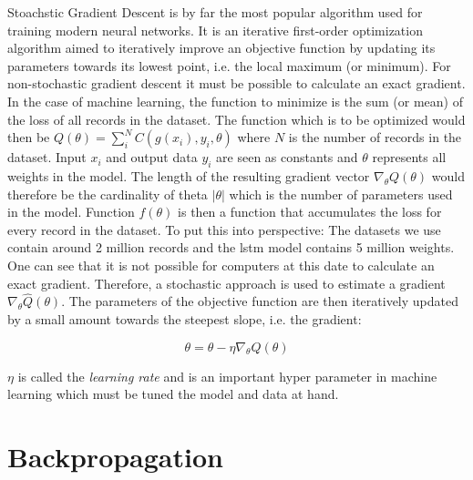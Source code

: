 Stoachstic Gradient Descent is by far the most popular algorithm used for training modern neural networks. 
It is an iterative first-order optimization algorithm aimed to iteratively improve an objective function by updating its parameters towards its lowest point, i.e. the local maximum (or minimum). For non-stochastic gradient descent it must be possible to calculate an exact gradient. In the case of machine learning, the function to minimize is the sum (or mean) of the loss of all records in the dataset. The function which is to be optimized would then be $Q(\theta) = \sum^N_i C(g(x_i),y_i,\theta)$ where $N$ is the number of records in the dataset. Input $x_i$ and output data $y_i$ are seen as constants and $\theta$ represents all weights in the model. The length of the resulting gradient vector $\nabla_\theta Q(\theta)$ would therefore be the cardinality of theta $|\theta|$ which is the number of parameters used in the model. Function $f(\theta)$ is then a function that accumulates the loss for every record in the dataset. To put this into perspective: The datasets we use contain around 2 million records and the \gls{lstm} model contains 5 million weights. One can see that it is not possible for computers at this date to calculate an exact gradient. Therefore, a stochastic approach is used to estimate a gradient $\nabla_\theta \hat{Q}(\theta)$. The parameters of the objective function are then iteratively updated by a small amount towards the steepest slope, i.e. the gradient:

\begin{equation}
\theta = \theta - \eta\nabla_\theta Q(\theta)
\end{equation}

$\eta$ is called the \textit{learning rate} and is an important hyper parameter in machine learning which must be tuned the model and data at hand.



\section{Backpropagation} \label{sec:background:backprop}

